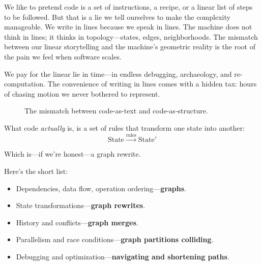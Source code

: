 We like to pretend code is a set of instructions, a recipe, or a linear list of steps to be followed. But that is a lie we tell ourselves to make the complexity manageable. We write in lines because we speak in lines. The machine does not think in lines; it thinks in topology—states, edges, neighborhoods. The mismatch between our linear storytelling and the machine's geometric reality is the root of the pain we feel when software scales.

We pay for the linear lie in time—in endless debugging, archaeology, and re-computation. The convenience of writing in lines comes with a hidden tax: hours of chasing motion we never bothered to represent.

\begin{figure}[h]
\centering
{}
\caption{The mismatch between code-as-text and code-as-structure.}
\end{figure}

What code \textit{actually} is, is a set of rules that transform one state into another:
\[
\text{State} \xrightarrow{\text{rules}} \text{State}'
\]

Which is—if we’re honest—a graph rewrite.

Here’s the short list:
\begin{itemize}
    \item Dependencies, data flow, operation ordering—\textbf{graphs}.
    \item State transformations—\textbf{graph rewrites}.
    \item History and conflicts—\textbf{graph merges}.
    \item Parallelism and race conditions—\textbf{graph partitions colliding}.
    \item Debugging and optimization—\textbf{navigating and shortening paths}.
\end{itemize}

